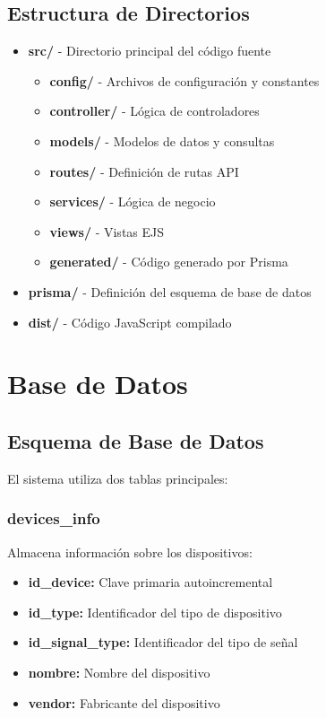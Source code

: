 \documentclass{article}
\begin{document}
\subsection{Estructura de Directorios}
\begin{itemize}
    \item \textbf{src/} - Directorio principal del código fuente
    \begin{itemize}
        \item \textbf{config/} - Archivos de configuración y constantes
        \item \textbf{controller/} - Lógica de controladores
        \item \textbf{models/} - Modelos de datos y consultas
        \item \textbf{routes/} - Definición de rutas API
        \item \textbf{services/} - Lógica de negocio
        \item \textbf{views/} - Vistas EJS
        \item \textbf{generated/} - Código generado por Prisma
    \end{itemize}
    \item \textbf{prisma/} - Definición del esquema de base de datos
    \item \textbf{dist/} - Código JavaScript compilado
\end{itemize}

\section{Base de Datos}
\subsection{Esquema de Base de Datos}
El sistema utiliza dos tablas principales:

\subsubsection{devices\_info}
Almacena información sobre los dispositivos:
\begin{itemize}
    \item \textbf{id\_device:} Clave primaria autoincremental
    \item \textbf{id\_type:} Identificador del tipo de dispositivo
    \item \textbf{id\_signal\_type:} Identificador del tipo de señal
    \item \textbf{nombre:} Nombre del dispositivo
    \item \textbf{vendor:} Fabricante del dispositivo
\end{itemize}
\end{document}
